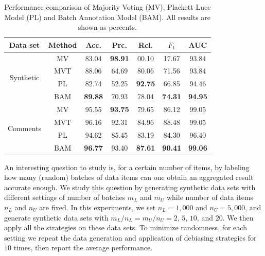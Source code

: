 \begin{table}[!t]
\centering
 {\caption{Performance comparison of Majority Voting (MV), Plackett-Luce Model (PL) and Batch Annotation Model (BAM).  
 All results are shown as percents.}\label{tab:performance}}
{

  \begin{tabular}{@{}c@{}|@{}c@{}||c|c|c|c|c@{}}
    \hline
        Data set & Method    & Acc.           & Prc.           & Rcl.           & $F_1$          & AUC \\ \hline \hline
        \multirow{4}{*}{Synthetic}
                 & MV        & 83.04          & \textbf{98.91} & 00.10          & 17.67          & 93.84          \\ \cline{2-7}
                 & MVT       & 88.06          & 64.69          & 80.06          & 71.56          & 93.84          \\ \cline{2-7}
                 & PL        & 82.74          & 52.25          & \textbf{92.75} & 66.85          & 94.46          \\ \cline{2-7}
                 & BAM       & \textbf{89.88} & 70.93          & 78.04          & \textbf{74.31} & \textbf{94.95} \\ \hline
        \multirow{4}{*}{Comments}
                 & MV        & 95.55          & \textbf{93.75} & 79.65          & 86.12          & 99.05          \\ \cline{2-7}
                 & MVT       & 96.16          & 92.31          & 84.96          & 88.48          & 99.05          \\ \cline{2-7}
                 & PL        & 94.62          & 85.45          & 83.19          & 84.30          & 96.40          \\ \cline{2-7}
                 & BAM       & \textbf{96.77} & 93.40          & \textbf{87.61} & \textbf{90.41} & \textbf{99.06} \\ \hline
  \end{tabular}
}
\end{table}





An interesting question to study is, 
for a certain number of items, by labeling how many (random) batches of data items can one obtain an aggregated result accurate enough.
We study this question by generating synthetic data sets 
with different settings of number of batches $m_L$ and $m_U$ while number of data items $n_L$ and $n_U$ are fixed.  
In this experiments, we set $n_L=1,000$ and $n_U=5,000$, 
and generate synthetic data sets with $m_L/n_L=m_U/n_U=2$, $5$, $10$, and $20$.  
We then apply all the strategies on these data sets.  
To minimize randomness, for each setting we repeat the data generation and application of debiasing strategies for $10$ times, 
then report the average performance.  

